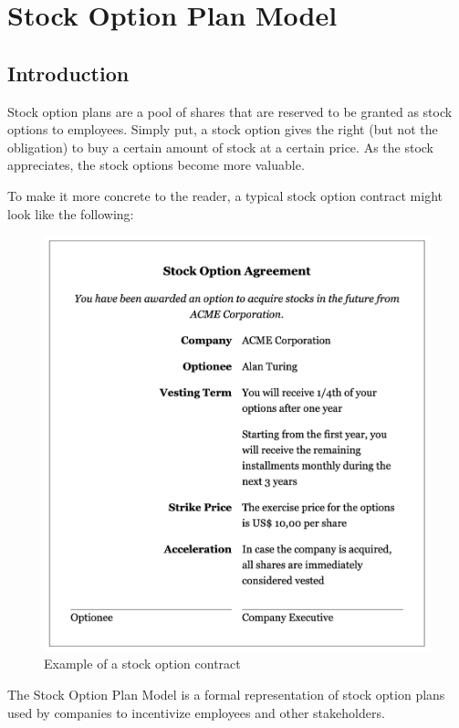 \chapter{Stock Option Plan Model}

\section{Introduction}

Stock option plans are a pool of shares that are reserved to be granted as stock options to employees. Simply put, a stock option gives the right (but not the obligation) to buy a certain amount of stock at a certain price. As the stock appreciates, the stock options become more valuable.

To make it more concrete to the reader, a typical stock option contract might look like the following:

\begin{figure}[h!]
\includegraphics[width=\textwidth]{pics/sopa.png}
\caption{Example of a stock option contract}
\label{fig:stock_option_contract}
\end{figure}

The Stock Option Plan Model is a formal representation of stock option plans used by companies to incentivize employees and other stakeholders. 
